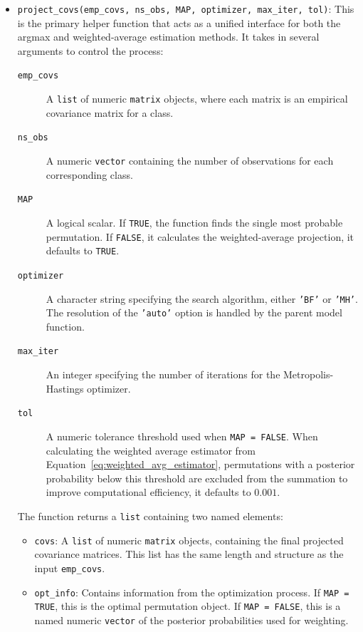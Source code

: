 \documentclass[a4paper,11pt,twoside]{report}
\theoremstyle{definition}
\begin{document}
\begin{itemize}
    \item \texttt{project\_covs(emp\_covs, ns\_obs, MAP, optimizer, max\_iter, tol)}: This is the primary helper function that acts as a unified interface for both the argmax and weighted-average estimation methods. It takes in several arguments to control the process:
    \begin{description}
        \item[\texttt{emp\_covs}] A \texttt{list} of numeric \texttt{matrix} objects, where each matrix is an empirical covariance matrix for a class.
        \item[\texttt{ns\_obs}] A numeric \texttt{vector} containing the number of observations for each corresponding class.
        \item[\texttt{MAP}] A logical scalar. If \texttt{TRUE}, the function finds the single most probable permutation. If \texttt{FALSE}, it calculates the weighted-average projection, it defaults to \texttt{TRUE}.
        \item[\texttt{optimizer}] A character string specifying the search algorithm, either \texttt{'BF'} or \texttt{'MH'}. The resolution of the \texttt{'auto'} option is handled by the parent model function.
        \item[\texttt{max\_iter}] An integer specifying the number of iterations for the Metropolis-Hastings optimizer.
        \item[\texttt{tol}] A numeric tolerance threshold used when \texttt{MAP = FALSE}. When calculating the weighted average estimator from Equation~\eqref{eq:weighted_avg_estimator}, permutations with a posterior probability below this threshold are excluded from the summation to improve computational efficiency, it defaults to $0.001$.
    \end{description}
    The function returns a \texttt{list} containing two named elements:
    \begin{itemize}
        \item \texttt{covs}: A \texttt{list} of numeric \texttt{matrix} objects, containing the final projected covariance matrices. This list has the same length and structure as the input \texttt{emp\_covs}.
        \item \texttt{opt\_info}: Contains information from the optimization process. If \texttt{MAP = TRUE}, this is the optimal permutation object. If \texttt{MAP = FALSE}, this is a named numeric \texttt{vector} of the posterior probabilities used for weighting.
    \end{itemize}


\end{itemize}
\end{document}
